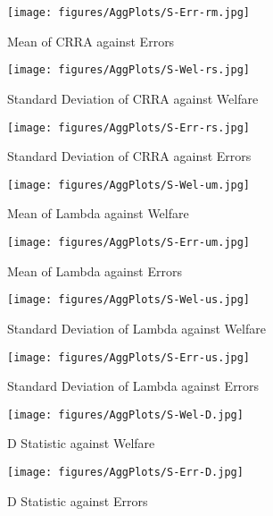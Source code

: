 \documentclass[../main.tex]{subfiles}
\begin{document}
\begin{figure}[hp!]
	\center
	\caption{Mean of CRRA against Errors}
	\texttt{[image: figures/AggPlots/S-Err-rm.jpg]}
	\label{fig:S-Err-rm}
\end{figure}

\begin{figure}[hp!]
	\center
	\caption{Standard Deviation of CRRA against Welfare}
	\texttt{[image: figures/AggPlots/S-Wel-rs.jpg]}
	\label{fig:S-Wel-rs}
\end{figure}

\begin{figure}[hp!]
	\center
	\caption{Standard Deviation of CRRA against Errors}
	\texttt{[image: figures/AggPlots/S-Err-rs.jpg]}
	\label{fig:S-Err-rs}
\end{figure}

\begin{figure}[hp!]
	\center
	\caption{Mean of Lambda against Welfare}
	\texttt{[image: figures/AggPlots/S-Wel-um.jpg]}
	\label{fig:S-Wel-um}
\end{figure}

\begin{figure}[hp!]
	\center
	\caption{Mean of Lambda against Errors}
	\texttt{[image: figures/AggPlots/S-Err-um.jpg]}
	\label{fig:S-Err-um}
\end{figure}

\begin{figure}[hp!]
	\center
	\caption{Standard Deviation of Lambda against Welfare}
	\texttt{[image: figures/AggPlots/S-Wel-us.jpg]}
	\label{fig:S-Wel-us}
\end{figure}

\begin{figure}[hp!]
	\center
	\caption{Standard Deviation of Lambda against Errors}
	\texttt{[image: figures/AggPlots/S-Err-us.jpg]}
	\label{fig:S-Err-us}
\end{figure}

\begin{figure}[hp!]
	\center
	\caption{D Statistic against Welfare}
	\texttt{[image: figures/AggPlots/S-Wel-D.jpg]}
	\label{fig:D-Wel-smooth}
\end{figure}

\begin{figure}[hp!]
	\center
	\caption{D Statistic against Errors}
	\texttt{[image: figures/AggPlots/S-Err-D.jpg]}
	\label{fig:D-Err-smooth}
\end{figure}

\newpage

\onlyinsubfile{
\newpage
\printbibliography[segment=3, heading=subbibliography]
}
\end{document}
